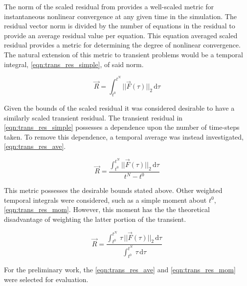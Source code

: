 The norm of the scaled residual from  provides a well-scaled metric for instantaneous nonlinear convergence at any given time in the simulation.
The residual vector norm is divided by the number of equations in the residual to provide an average residual value per equation.
This equation averaged scaled residual provides a metric for determining the degree of nonlinear convergence.
The natural extension of this metric to transient problems would be a temporal integral, \eqref{eqn:trans_res_simple}, of said norm.

\begin{equation}
\label{eqn:trans_res_simple}
\vec{R} = \int_{t^{0}}^{t^{N}} ||\vec{F}(\tau)||_2 \,\mathrm{d} \tau
\end{equation}

Given the bounds of the scaled residual it was considered desirable to have a similarly scaled transient residual.
The transient residual in \eqref{eqn:trans_res_simple} possesses a dependence upon the number of time-steps taken.
To remove this dependence, a temporal average was instead investigated, \eqref{eqn:trans_res_ave}.

\begin{equation}
\label{eqn:trans_res_ave}
\vec{R} = \frac{\int_{t^{0}}^{t^{N}} ||\vec{F}(\tau)||_2 \,\mathrm{d} \tau}{t^{N} - t^{0}}
\end{equation}

This metric possesses the desirable bounds stated above.
Other weighted temporal integrals were considered, such as a simple moment about $t^{0}$, \eqref{eqn:trans_res_mom}.
However, this moment has the the theoretical disadvantage of weighting the latter portion of the transient.

\begin{equation}
\label{eqn:trans_res_mom}
\vec{R} = \frac{\int_{t^{0}}^{t^{N}} \,\tau\,||\vec{F}(\tau)||_2 \,\mathrm{d} \tau}{\int_{t^{0}}^{t^{N}} \,\tau \,\mathrm{d} \tau}
\end{equation}

For the preliminary work, the \eqref{eqn:trans_res_ave} and \eqref{eqn:trans_res_mom} were selected for evaluation.
